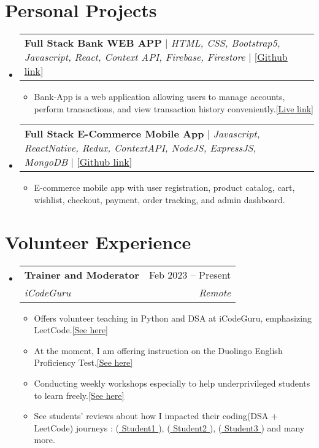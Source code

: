 \documentclass[letterpaper,11pt]{article}
\makeatletter
\newcommand{\resumeItem}[1]{
  \item\small{
    {#1 \vspace{-2pt}}
  }
}
\newcommand{\resumeSubheading}[4]{
  \vspace{-2pt}\item
    \begin{tabular*}{0.97\textwidth}[t]{l@{\extracolsep{\fill}}r}
      \textbf{#1} & #2 \\
      \textit{\small#3} & \textit{\small #4} \\
    \end{tabular*}\vspace{-7pt}
}
\newcommand{\resumeProjectHeading}[2]{
    \item
    \begin{tabular*}{0.97\textwidth}{l@{\extracolsep{\fill}}r}
      \small#1 & #2 \\
    \end{tabular*}\vspace{-7pt}
}
\newcommand{\resumeSubHeadingListStart}{\begin{itemize}[leftmargin=0.15in, label={}]}
\newcommand{\resumeSubHeadingListEnd}{\end{itemize}}
\newcommand{\resumeItemListStart}{\begin{itemize}}
\newcommand{\resumeItemListEnd}{\end{itemize}\vspace{-5pt}}
\makeatother
\begin{document}
\section{Personal Projects}
\resumeSubHeadingListStart
\resumeProjectHeading
{\textbf{{Full Stack Bank WEB APP}} $|$ \emph{HTML, CSS, Bootstrap5, Javascript, React, Context API, Firebase, Firestore} $|$ [{\href{https://github.com/Ahmadjajja/React_Bank}{\underline{Github link}}}]}{}
\resumeItemListStart
\resumeItem{Bank-App is a web application allowing users to manage accounts, perform
  transactions, and view transaction history conveniently.[{\href{https://jajja-bank-app.web.app/}{\underline{Live link}}}]}
\resumeItemListEnd
\resumeProjectHeading
{\textbf{{Full Stack E-Commerce Mobile App}} $|$ \emph{Javascript, ReactNative, Redux, ContextAPI, NodeJS,
    ExpressJS, MongoDB} $|$ [{\href{https://github.com/Ahmadjajja/E_Commerce_Mobile_App_Frontend}{\underline{Github link}}}]}{}
\resumeItemListStart
\resumeItem{E-commerce mobile app with user registration, product catalog, cart, wishlist,
  checkout, payment, order tracking, and admin dashboard.}
\resumeItemListEnd
\resumeSubHeadingListEnd
%


\section{Volunteer Experience}
\resumeSubHeadingListStart
\resumeSubheading
{Trainer and Moderator}{Feb 2023 -- Present}
{iCodeGuru}{Remote}
\resumeItemListStart
\resumeItem{Offers volunteer teaching in Python and DSA at iCodeGuru, emphasizing LeetCode.{\href{https://github.com/Ahmadjajja/LeetCode_Volunteer_Teaching}{\underline{[See here]}}}}
\resumeItem{At the moment, I am offering instruction on the Duolingo English Proficiency Test.{\href{https://www.linkedin.com/feed/update/urn:li:activity:7169346246216671232/}{\underline{[See here]}}}}
\resumeItem{Conducting weekly workshops especially to help underprivileged students to learn freely.{\href{https://github.com/Ahmadjajja/LeetCode_Volunteer_Teaching}{\underline{[See here]}}}}
\resumeItem{See students' reviews about how I impacted their coding(DSA + LeetCode) journeys : ({\href{https://www.linkedin.com/posts/sikander-nawaz_dsa-dsa-leetcode-activity-7170805639886106624-Kxka?utm_source=share&utm_medium=member_desktop}{\underline{ Student1 }}}), ({\href{https://www.linkedin.com/posts/syedshahzilimran_mastering-trees-unlocking-the-key-of-dsa-activity-7174974045019398144-DN_C?utm_source=share&utm_medium=member_desktop}{\underline{ Student2 }}}), ({\href{https://www.linkedin.com/feed/update/urn:li:activity:7173635314391920640/}{\underline{ Student3 }}}) and many more. }
\resumeItemListEnd
\resumeSubHeadingListEnd
%
\end{document}
